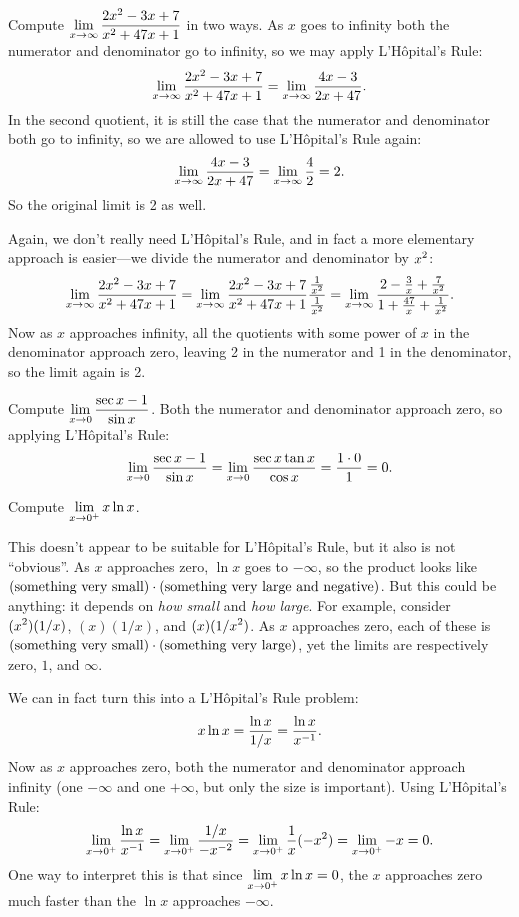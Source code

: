 \begin{example} Compute $\displaystyle\lim_{x\to \infty}{2x^2-3x+7\over
x^2+47x+1}$ in two ways.
\msk
As $x$ goes to infinity both the numerator and denominator go to
infinity, so we may apply L'H\^opital's Rule:
$$\lim_{x\to \infty}{2x^2-3x+7\over x^2+47x+1}=
\lim_{x\to \infty}{4x-3\over 2x+47}.$$
In the second quotient, it is still the case that the numerator and
denominator both go to infinity, so we are allowed to use
L'H\^opital's Rule again:
$$\lim_{x\to \infty}{4x-3\over 2x+47}=\lim_{x\to \infty}{4\over 2}=2.$$
So the original limit is 2 as well.

Again, we don't really need L'H\^opital's Rule, and in fact a more
elementary approach is easier---we divide the numerator and
denominator by $\displaystyle x^2$:
$$\lim_{x\to \infty}{2x^2-3x+7\over x^2+47x+1}=
\lim_{x\to \infty}{2x^2-3x+7\over x^2+47x+1}{{1\over x^2}\over {1\over
    x^2}}=
\lim_{x\to \infty}{2-{3\over x}+{7\over x^2}\over
1+{47\over x}+{1\over x^2}}.$$
Now as $x$ approaches infinity, all the quotients with some power of
$x$ in the denominator approach zero, leaving 2 in the numerator and 1
in the denominator, so the limit again is 2.
\end{example}

\begin{example} Compute $\displaystyle\lim_{x\to 0}{\sec x - 1\over \sin x}$.
\msk
Both the numerator and denominator approach zero, so applying 
L'H\^opital's Rule:
$$\lim_{x\to 0}{\sec x - 1\over \sin x}=
\lim_{x\to 0}{\sec x\tan x\over \cos x}={1\cdot 0\over 1}=0.$$
\vskip -16pt
\end{example}

\begin{example} Compute $\displaystyle\lim_{x\to 0^+} x\ln x$.

This doesn't appear to be suitable for L'H\^opital's Rule, but it also
is not ``obvious''. As $x$ approaches zero, $\ln x$ goes to $-\infty$,
so the product looks like $(\hbox{something very small})\cdot 
(\hbox{something very large and negative})$. But this could be
anything: it depends on {\it how small\/} and {\it how large}. 
For example, consider $\displaystyle (x^2)(1/x)$, $(x)(1/x)$, and $\displaystyle (x)(1/x^2)$. As
$x$ approaches zero, each of these is $(\hbox{something very small})\cdot 
(\hbox{something very large})$, yet the limits are respectively 
zero, $1$, and $\infty$.

We can
in fact turn this into a L'H\^opital's Rule problem:
$$x\ln x = {\ln x\over 1/x}={\ln x\over x^{-1}}.$$
Now as $x$ approaches zero, both the numerator and denominator
approach infinity (one $-\infty$ and one $+\infty$, but only the size
is important). Using  L'H\^opital's Rule:
$$\lim_{x\to 0^+} {\ln x\over x^{-1}}=
\lim_{x\to 0^+} {1/x\over -x^{-2}} =\lim_{x\to 0^+} {1\over x}(-x^2)=
\lim_{x\to 0^+} -x = 0.$$
One way to interpret this is that since $\displaystyle\lim_{x\to
  0^+}x\ln x = 0$, the $x$ approaches zero much faster than the $\ln x$
approaches $-\infty$.
\end{example}

